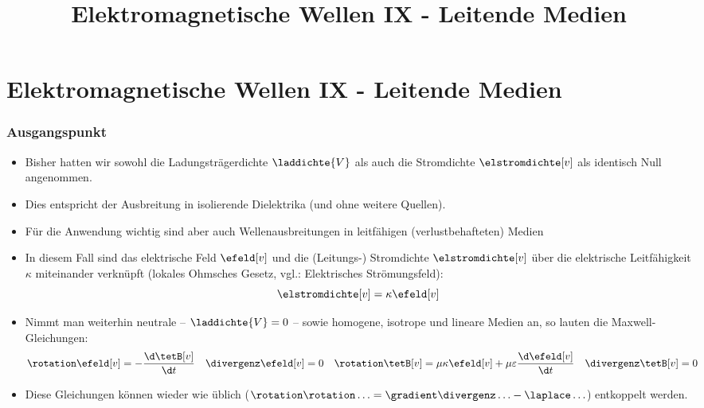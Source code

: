 
  
\title[TET: Elektromagnetische Wellen IX - Leitende Medien]{Elektromagnetische Wellen IX - Leitende Medien}


% 
% 

\maketitle

% 
% 
\section{Elektromagnetische Wellen IX - Leitende Medien}

\begin{frame}
  \frametitle{Ausgangspunkt}
  \begin{itemize}[<+->]
  \item Bisher hatten wir sowohl die Ladungsträgerdichte \(\laddichte{V}\) als auch die Stromdichte \(\elstromdichte[v]\) als identisch Null angenommen.
  \item Dies entspricht der \alert{Ausbreitung in isolierende Dielektrika} (und ohne weitere Quellen).
  \item Für die \alert{Anwendung wichtig} sind aber auch \alert{Wellenausbreitungen in leitfähigen (verlustbehafteten) Medien}
  \item In diesem Fall sind das elektrische Feld \(\efeld[v]\) und die (Leitungs-) Stromdichte \(\elstromdichte[v]\) über die elektrische Leitfähigkeit \(\kappa\) miteinander verknüpft (\alert{lokales Ohmsches Gesetz}, vgl.: Elektrisches Strömungsfeld):
    \begin{equation*}
      \elstromdichte[v] = \kappa \efeld[v]
    \end{equation*}
  \item Nimmt man weiterhin neutrale -- \(\laddichte{V} = 0\) -- sowie homogene, isotrope und lineare Medien an, so lauten die Maxwell-Gleichungen:
    \begin{align*}
      \rotation \efeld[v] &= -\frac{\d \tetB[v]}{\d t} & \divergenz \efeld[v] &= 0 & \rotation \tetB[v] &= \mu\kappa \efeld[v] + \mu\varepsilon \frac{\d \efeld[v]}{\d t} & \divergenz\tetB[v] &= 0
    \end{align*}
    \item Diese Gleichungen können wieder wie üblich (\(\rotation\rotation\ldots = \gradient\divergenz\ldots - \laplace\ldots\)) entkoppelt werden.
    \end{itemize}
    \ 
  \end{frame}

